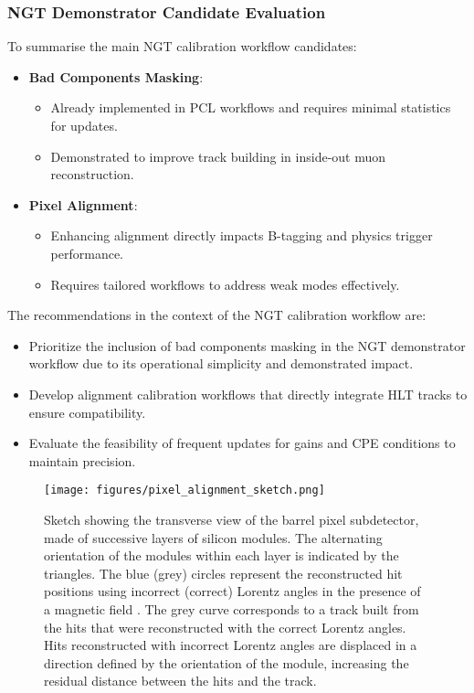 \subsubsection{NGT Demonstrator Candidate Evaluation}

To summarise the main NGT calibration workflow candidates:
\begin{itemize}
    \item \textbf{Bad Components Masking}:
    \begin{itemize}
        \item Already implemented in PCL workflows and requires minimal statistics for updates.
        \item Demonstrated to improve track building in inside-out muon reconstruction.
    \end{itemize}
    \item \textbf{Pixel Alignment}:
    \begin{itemize}
        \item Enhancing alignment directly impacts B-tagging and physics trigger performance.
        \item Requires tailored workflows to address weak modes effectively.
    \end{itemize}
\end{itemize}

The recommendations in the context of the NGT calibration workflow are:
\begin{itemize}
    \item Prioritize the inclusion of bad components masking in the NGT demonstrator workflow due to its operational simplicity and demonstrated impact.
    \item Develop alignment calibration workflows that directly integrate HLT tracks to ensure compatibility.
    \item Evaluate the feasibility of frequent updates for gains and CPE conditions to maintain precision.
\end{itemize}

\begin{figure}[htbp]
   \centering
	\texttt{[image: figures/pixel\_alignment\_sketch.png]}
   \caption{Sketch showing the transverse view of the \Phasezero barrel pixel subdetector, made of successive layers of silicon modules. The alternating orientation of the modules within each layer is indicated by the triangles. The blue (grey) circles represent the reconstructed hit positions using incorrect (correct) Lorentz angles in the presence of a magnetic field . The grey curve corresponds to a track built from the hits that were reconstructed with the correct Lorentz angles. Hits reconstructed with incorrect Lorentz angles are displaced in a direction defined by the orientation of the module, increasing the residual distance between the hits and the track.~\cite{CMS:2021ime}}
   \label{fig:pixelAlignment}
\end{figure}